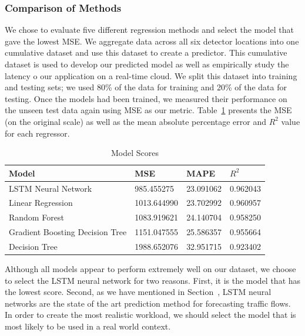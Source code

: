 \documentclass{article}
\newcommand{\RNum}[1]{\uppercase\expandafter{\romannumeral #1\relax}}
\begin{document}
\subsubsection{Comparison of Methods}
We chose to evaluate five different regression methods and select the model that gave the lowest MSE. We aggregate data across all six detector locations into one cumulative dataset and use this dataset to create a predictor. This cumulative dataset is used to develop our predicted model as well as empirically study the latency o our application on a real-time cloud. We split this dataset into training and testing sets; we used 80\% of the data for training and 20\% of the data for testing. Once the models had been trained, we measured their performance on the unseen test data again using MSE as our metric. Table~\ref{tab:models} presents the MSE (on the original scale) as well as the mean absolute percentage error and $R^{2}$ value for each regressor.
\begin{table}[ht]
 \caption{Model Scores}
  \centering
  \begin{tabular}{llll}
    Model     & MSE & MAPE & $R^{2}$ \\
    \midrule
    LSTM Neural Network & 985.455275 & 23.091062 & 0.962043\\
    Linear Regression & 1013.644990 & 23.702992 & 0.960957\\
    Random Forest & 1083.919621 & 24.140704 & 0.958250\\
    Gradient Boosting Decision Tree & 1151.047555 &25.586357 & 0.955664 \\    
    Decision Tree & 1988.652076 & 32.951715 & 0.923402

  \end{tabular}
  \label{tab:models}
\end{table}
Although all models appear to perform extremely well on our dataset, we choose to select the LSTM neural network for two reasons. First, it is the model that has the lowest score. Second, as we have mentioned in Section~\RNum{2}, LSTM neural networks are the state of the art prediction method for forecasting traffic flows. In order to create the most realistic workload, we should select the model that is most likely to be used in a real world context.  
\end{document}
